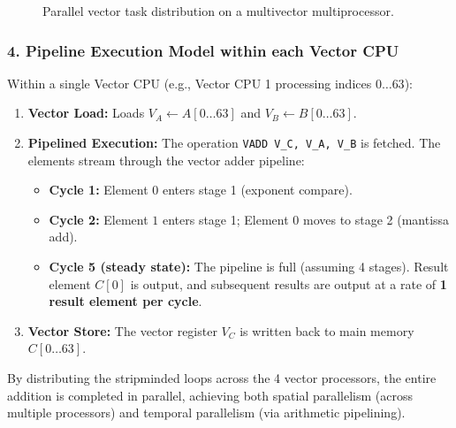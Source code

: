\documentclass[11pt, a4paper]{article}
\begin{document}
\begin{figure}[htbp]
    \centering
    \caption{Parallel vector task distribution on a multivector multiprocessor.}
\end{figure}

\subsubsection*{4. Pipeline Execution Model within each Vector CPU}
Within a single Vector CPU (e.g., Vector CPU 1 processing indices $0 \dots 63$):
\begin{enumerate}
    \item \textbf{Vector Load:} Loads $V_A \leftarrow A[0 \dots 63]$ and $V_B \leftarrow B[0 \dots 63]$.
    \item \textbf{Pipelined Execution:} The operation \texttt{VADD V\_C, V\_A, V\_B} is fetched. The elements stream through the vector adder pipeline:
    \begin{itemize}
        \item \textbf{Cycle 1:} Element $0$ enters stage 1 (exponent compare).
        \item \textbf{Cycle 2:} Element $1$ enters stage 1; Element $0$ moves to stage 2 (mantissa add).
        \item \textbf{Cycle 5 (steady state):} The pipeline is full (assuming 4 stages). Result element $C[0]$ is output, and subsequent results are output at a rate of \textbf{1 result element per cycle}.
    \end{itemize}
    \item \textbf{Vector Store:} The vector register $V_C$ is written back to main memory $C[0 \dots 63]$.
\end{enumerate}

By distributing the stripminded loops across the 4 vector processors, the entire addition is completed in parallel, achieving both spatial parallelism (across multiple processors) and temporal parallelism (via arithmetic pipelining).
\end{document}
